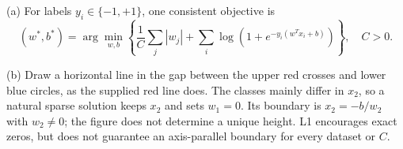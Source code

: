 (a) For labels \(y_i\in\{-1,+1\}\), one consistent objective is
\[
(w^*,b^*)=\arg\min_{w,b}\left\{\frac1C\sum_j|w_j|+
\sum_i\log\!\left(1+e^{-y_i(w^Tx_i+b)}\right)\right\},\quad C>0.
\]


(b) Draw a horizontal line in the gap between the upper red crosses and lower blue circles, as the supplied red line does. The classes mainly differ in \(x_2\), so a natural sparse solution keeps \(x_2\) and sets \(w_1=0\). Its boundary is \(x_2=-b/w_2\) with \(w_2\ne0\); the figure does not determine a unique height. L1 encourages exact zeros, but does not guarantee an axis-parallel boundary for every dataset or \(C\).
